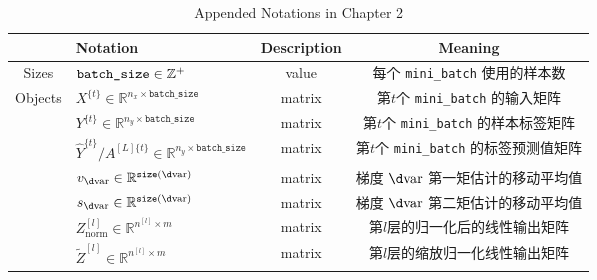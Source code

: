 \begin{table}[h!tbp]
    \centering
    \begin{threeparttable}
    \caption{Appended Notations in Chapter 2}
    \begin{tabular}{clcc}
        \toprule
                                        & \textbf{Notation}                                                                     & \textbf{Description} & \textbf{Meaning}                                                   \\ 
        \midrule
        \multirow{1}{*}{Sizes}          & $\verb|batch_size| \in \mathbb{Z}^+$								                    & value                & 每个 \verb|mini_batch| 使用的样本数                                  \\
        \midrule
        \multirow{9}{*}{Objects}        & $X^{\{t\}} \in \mathbb{R}^{n_x \times \mathtt{batch\_size}}$                          & matrix               & 第$t$个 \verb|mini_batch| 的输入矩阵                                 \\
                                        & $Y^{\{t\}} \in {\mathbb{R}^{n_y \times \mathtt{batch\_size}}}$                        & matrix               & 第$t$个 \verb|mini_batch| 的样本标签矩阵                              \\									
                                        & $\hat{Y}^{\{t\}} / A^{[L]\{t\}} \in {\mathbb{R}^{n_y \times \mathtt{batch\_size}}}$   & matrix               & 第$t$个 \verb|mini_batch| 的标签预测值矩阵   						   \\
                                        & $v_{\d \mathrm{var}} \in \mathbb{R}^{\mathtt{size}(\d \mathrm{var})}$                 & matrix               & 梯度 $\d \mathrm{var}$ 第一矩估计的移动平均值                          \\
                                        & $s_{\d \mathrm{var}} \in \mathbb{R}^{\mathtt{size}(\d \mathrm{var})}$                 & matrix               & 梯度 $\d \mathrm{var}$ 第二矩估计的移动平均值                         \\
                                        & $Z^{[l]}_{\mathrm{norm}} \in \mathbb{R}^{n^{[l]} \times {m}}$                         & matrix               & 第$l$层的归一化后的线性输出矩阵                                       \\
                                        & $\tilde{Z}^{[l]} \in \mathbb{R}^{n^{[l]} \times {m}}$                                 & matrix               & 第$l$层的缩放归一化线性输出矩阵                                       \\

\end{tabular}
\end{threeparttable}
\end{table}
